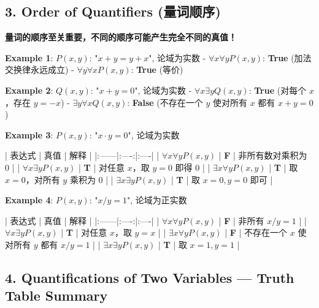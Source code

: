 \documentclass[10pt,a4paper,openany]{ctexbook}
\theoremstyle{definition}
\theoremstyle{remark}
\renewenvironment{quote}
  {\list{}{\leftmargin=1em\rightmargin=0pt\topsep=0.5pt\partopsep=0pt}\item[]}
  {\endlist}
\begin{document}
\vspace{-2pt}

\subsection{3. Order of Quantifiers (量词顺序)}

\begin{quote}
\textbf{量词的顺序至关重要，不同的顺序可能产生完全不同的真值！}

\textbf{Example 1}: $P(x,y)$: "$x + y = y + x$", 论域为实数
- $\forall x \forall y P(x,y)$: \textbf{True} (加法交换律永远成立)
- $\forall y \forall x P(x,y)$: \textbf{True} (等价)

\textbf{Example 2}: $Q(x,y)$: "$x + y = 0$", 论域为实数
- $\forall x \exists y Q(x,y)$: \textbf{True} (对每个 $x$，存在 $y = -x$)
- $\exists y \forall x Q(x,y)$: \textbf{False} (不存在一个 $y$ 使对所有 $x$ 都有 $x + y = 0$)

\textbf{Example 3}: $P(x,y)$: "$x \cdot y = 0$", 论域为实数

| 表达式 | 真值 | 解释 |
|:------|:----:|:----|
| $\forall x \forall y P(x,y)$ | \textbf{F} | 非所有数对乘积为 0 |
| $\forall x \exists y P(x,y)$ | \textbf{T} | 对任意 $x$，取 $y=0$ 即得 0 |
| $\exists x \forall y P(x,y)$ | \textbf{T} | 取 $x=0$，对所有 $y$ 乘积为 0 |
| $\exists x \exists y P(x,y)$ | \textbf{T} | 取 $x=0,y=0$ 即可 |

\textbf{Example 4}: $P(x,y)$: "$x / y = 1$", 论域为正实数

| 表达式 | 真值 | 解释 |
|:------|:----:|:----|
| $\forall x \forall y P(x,y)$ | \textbf{F} | 非所有 $x/y=1$ |
| $\forall x \exists y P(x,y)$ | \textbf{T} | 对任意 $x$，取 $y=x$ |
| $\exists x \forall y P(x,y)$ | \textbf{F} | 不存在一个 $x$ 使对所有 $y$ 都有 $x/y=1$ |
| $\exists x \exists y P(x,y)$ | \textbf{T} | 取 $x=1,y=1$ |

\end{quote}
\vspace{-2pt}

\subsection{4. Quantifications of Two Variables — Truth Table Summary}
\end{document}
